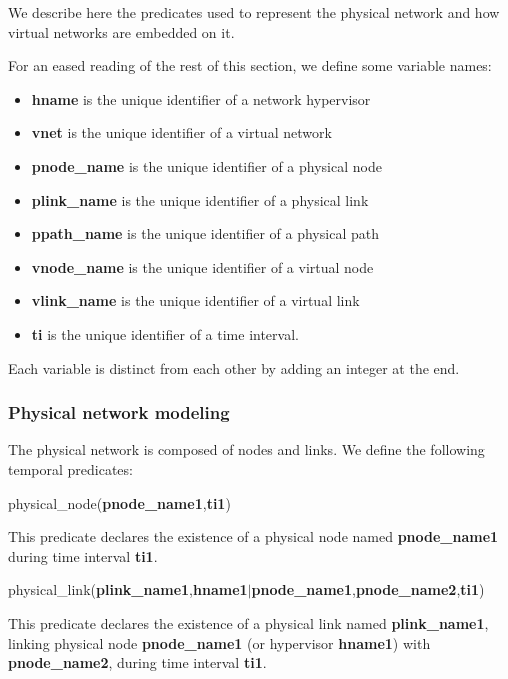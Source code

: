 We describe here the predicates used to represent the physical network and how virtual networks are embedded on it.

For an eased reading of the rest of this section, we define some variable names:

\begin{itemize}
    \item \textbf{hname} is the unique identifier of a network hypervisor
    \item \textbf{vnet} is the unique identifier of a virtual network
    \item \textbf{pnode\_name} is the unique identifier of a physical node
    \item \textbf{plink\_name} is the unique identifier of a physical link
    \item \textbf{ppath\_name} is the unique identifier of a physical path
    \item \textbf{vnode\_name} is the unique identifier of a virtual node
    \item \textbf{vlink\_name} is the unique identifier of a virtual link
    \item \textbf{ti} is the unique identifier of a time interval.
\end{itemize}

Each variable is distinct from each other by adding an integer at the end.

\subsubsection{Physical network modeling}


The physical network is composed of nodes and links. We define the following temporal predicates:
\begin{myformula}
physical\_node(\textbf{pnode\_name1},\textbf{ti1})
\end{myformula}

This predicate declares the existence of a physical node named \textbf{pnode\_name1} during time interval \textbf{ti1}.
\begin{myformula}
physical\_link(\textbf{plink\_name1},\textbf{hname1}$\vert$\textbf{pnode\_name1},\textbf{pnode\_name2},\textbf{ti1})
\end{myformula}

This predicate declares the existence of a physical link named \textbf{plink\_name1}, linking physical node \textbf{pnode\_name1} (or hypervisor \textbf{hname1}) with \textbf{pnode\_name2}, during time interval \textbf{ti1}.

